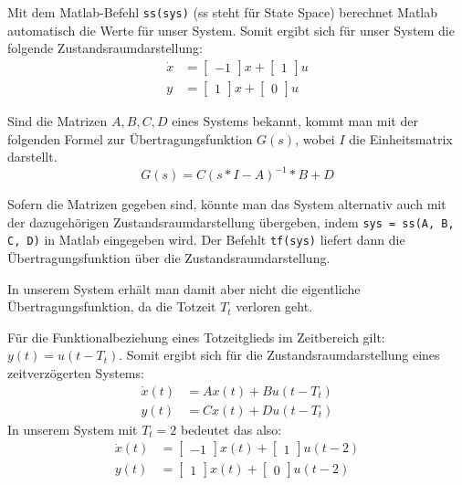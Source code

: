 Mit dem Matlab-Befehl \texttt{ss(sys)} (ss steht für State Space) berechnet Matlab automatisch die Werte für unser System. Somit ergibt sich für unser System die folgende Zustandsraumdarstellung:
\begin{align*}
    \dot x & = \begin{bmatrix}
        -1
    \end{bmatrix}x + \begin{bmatrix}
        1
    \end{bmatrix}u \\
    y & = \begin{bmatrix}
        1
    \end{bmatrix}x + \begin{bmatrix}
        0
    \end{bmatrix}u
\end{align*}

Sind die Matrizen $A, B, C, D$ eines Systems bekannt, kommt man mit der folgenden Formel zur Übertragungsfunktion $G(s)$, wobei $I$ die Einheitsmatrix darstellt.
\[
    G(s) = C(s * I - A)^{-1} * B + D
\]

Sofern die Matrizen gegeben sind, könnte man das System alternativ auch mit der dazugehörigen Zustandsraumdarstellung übergeben, indem \texttt{sys = ss(A, B, C, D)} in Matlab eingegeben wird. Der Befehlt \texttt{tf(sys)} liefert dann die Übertragungsfunktion über die Zustandsraumdarstellung.

In unserem System erhält man damit aber nicht die eigentliche Übertragungsfunktion, da die Totzeit $T_t$ verloren geht.

Für die Funktionalbeziehung eines Totzeitglieds im Zeitbereich gilt: $y(t) = u(t-T_t)$. Somit ergibt sich für die Zustandsraumdarstellung eines zeitverzögerten Systems:
\begin{align*}
    \dot x(t) & = Ax(t) + Bu(t - T_t) \nonumber \\
    y(t) & = Cx(t) + Du(t - T_t)
\end{align*}
In unserem System mit $T_t = 2$ bedeutet das also:
\begin{align*}
    \dot x(t) & = \begin{bmatrix}
        -1
    \end{bmatrix}x(t) + \begin{bmatrix}
        1
    \end{bmatrix}u(t - 2) \nonumber \\
    y(t) & = \begin{bmatrix}
        1
    \end{bmatrix}x(t) + \begin{bmatrix}
        0
    \end{bmatrix}u(t - 2)
\end{align*}

